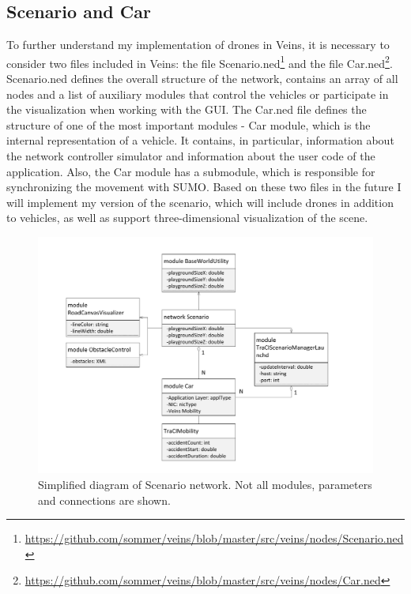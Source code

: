 \documentclass[]{nsm-thesis}
\begin{document}
\subsection {Scenario and Car}
\label{sec:scenarioned}

To further understand my implementation of drones in Veins, it is necessary to consider two files included in Veins: the file Scenario.ned\footnote{\url{https://github.com/sommer/veins/blob/master/src/veins/nodes/Scenario.ned}} and the file Car.ned\footnote{\url{https://github.com/sommer/veins/blob/master/src/veins/nodes/Car.ned}}. Scenario.ned defines the overall structure of the network, contains an array of all nodes and a list of auxiliary modules that control the vehicles or participate in the visualization when working with the GUI. The Car.ned file defines the structure of one of the most important modules - Car module, which is the internal representation of a vehicle. It contains, in particular, information about the network controller simulator and information about the user code of the application. Also, the Car module has a submodule, which is responsible for synchronizing the movement with SUMO. Based on these two files in the future I will implement my version of the scenario, which will include drones in addition to vehicles, as well as support three-dimensional visualization of the scene. 

\begin{figure}
	\centering
	\includegraphics[width=1\textwidth]{figures/Scenario.pdf}
	\caption{Simplified diagram of Scenario network. Not all modules, parameters and connections are shown.}
	\label{fig:scenarioned}
\end{figure}
\end{document}
